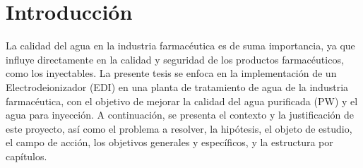 \chapter*{Introducción}
La calidad del agua en la industria farmacéutica es de suma importancia, 
ya que influye directamente en la calidad y seguridad de los productos 
farmacéuticos, como los inyectables. La presente tesis se enfoca en la 
implementación de un Electrodeionizador (EDI) en una planta 
de tratamiento de agua de la industria farmacéutica, con el objetivo de 
mejorar la calidad del agua purificada (PW) y el agua para inyección. 
A continuación, se presenta el contexto y la justificación de este 
proyecto, así como el problema a resolver, la hipótesis, el objeto 
de estudio, el campo de acción, los objetivos generales y específicos, 
y la estructura por capítulos.\\











